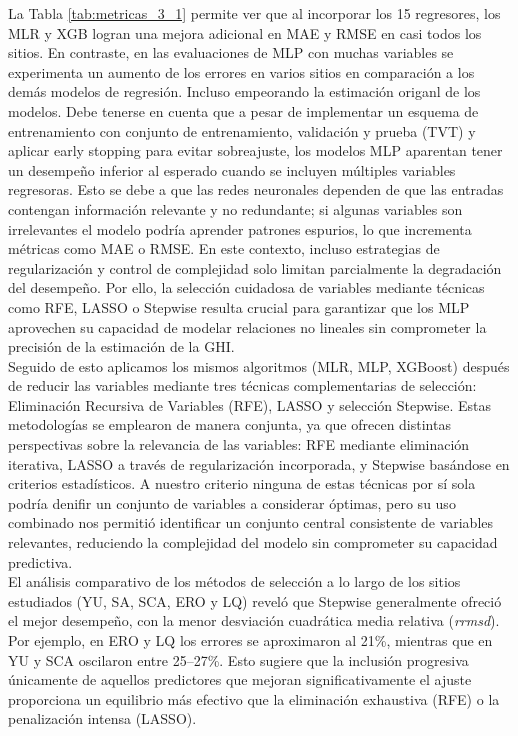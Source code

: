 La Tabla \ref{tab:metricas_3_1} permite ver que al incorporar los 15 regresores, los MLR y XGB logran una mejora adicional en MAE y RMSE en casi todos los sitios. En contraste, en las evaluaciones de MLP con muchas variables se experimenta un aumento de los errores en varios sitios en comparación a los demás modelos de regresión. Incluso empeorando la estimación origanl de los modelos. Debe tenerse en cuenta que a pesar de implementar un esquema de entrenamiento con conjunto de entrenamiento, validación y prueba (TVT) y aplicar early stopping para evitar sobreajuste, los modelos MLP aparentan tener un desempeño inferior al esperado cuando se incluyen múltiples variables regresoras. Esto se debe a que las redes neuronales dependen de que las entradas contengan información relevante y no redundante; si algunas variables son irrelevantes el modelo podría aprender patrones espurios, lo que incrementa métricas como MAE o RMSE. En este contexto, incluso estrategias de regularización y control de complejidad solo limitan parcialmente la degradación del desempeño. Por ello, la selección cuidadosa de variables mediante técnicas como RFE, LASSO o Stepwise resulta crucial para garantizar que los MLP aprovechen su capacidad de modelar relaciones no lineales sin comprometer la precisión de la estimación de la GHI.\\


Seguido de esto aplicamos los mismos algoritmos (MLR, MLP, XGBoost) después de reducir las variables mediante tres técnicas complementarias de selección: Eliminación Recursiva de Variables (RFE), LASSO y selección Stepwise. Estas metodologías se emplearon de manera conjunta, ya que ofrecen distintas perspectivas sobre la relevancia de las variables: RFE mediante eliminación iterativa, LASSO a través de regularización incorporada, y Stepwise basándose en criterios estadísticos. A nuestro criterio ninguna de estas técnicas por sí sola podría denifir un conjunto de variables a considerar óptimas, pero su uso combinado nos permitió identificar un conjunto central consistente de variables relevantes, reduciendo la complejidad del modelo sin comprometer su capacidad predictiva.\\

El análisis comparativo de los métodos de selección a lo largo de los sitios estudiados (YU, SA, SCA, ERO y LQ) reveló que Stepwise generalmente ofreció el mejor desempeño, con la menor desviación cuadrática media relativa (\textit{rrmsd}). Por ejemplo, en ERO y LQ los errores se aproximaron al 21\%, mientras que en YU y SCA oscilaron entre 25–27\%. Esto sugiere que la inclusión progresiva únicamente de aquellos predictores que mejoran significativamente el ajuste proporciona un equilibrio más efectivo que la eliminación exhaustiva (RFE) o la penalización intensa (LASSO).

